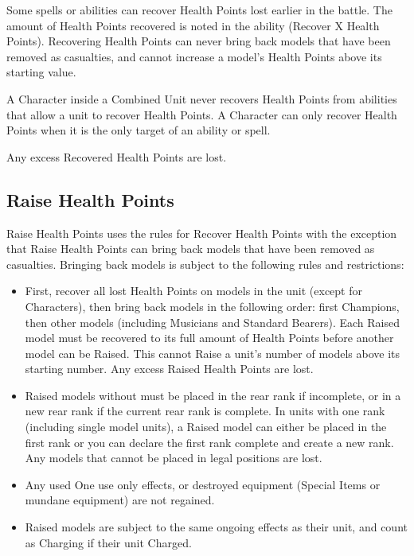 Some spells or abilities can recover Health Points lost earlier in the battle. The amount of Health Points recovered is noted in the ability (Recover X Health Points). Recovering Health Points can never bring back models that have been removed as casualties, and cannot increase a model's Health Points above its starting value.

A Character inside a Combined Unit never recovers Health Points from abilities that allow a unit to recover Health Points. A Character can only recover Health Points when it is the only target of an ability or spell.

Any excess Recovered Health Points are lost.

\subsection{Raise Health Points}
\label{raise_health_points}

Raise Health Points uses the rules for Recover Health Points with the exception that Raise Health Points can bring back models that have been removed as casualties. Bringing back models is subject to the following rules and restrictions:
\begin{itemize}
\item First, recover all lost Health Points on models in the unit (except for Characters), then bring back models in the following order: first Champions, then other \rnf{} models (including Musicians and Standard Bearers). Each Raised model must be recovered to its full amount of Health Points before another model can be Raised. This cannot Raise a unit's number of models above its starting number. Any excess Raised Health Points are lost.
\item Raised models without \frontrank{} must be placed in the rear rank if incomplete, or in a new rear rank if the current rear rank is complete. In units with one rank (including single model units), a Raised model can either be placed in the first rank or you can declare the first rank complete and create a new rank. Any models that cannot be placed in legal positions are lost.
\item Any used One use only effects, or destroyed equipment (Special Items or mundane equipment) are not regained.
\item Raised models are subject to the same ongoing effects as their unit, and count as Charging if their unit Charged.
\end{itemize}

